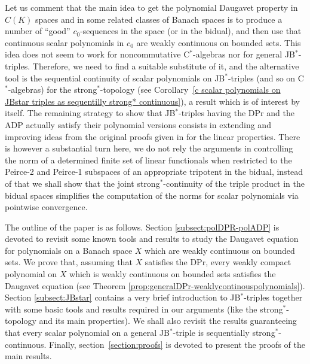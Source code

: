 \documentclass[10pt]{amsart}
\begin{document}
Let us comment that the main idea to get the polynomial Daugavet property in $C(K)$ spaces and in some related classes of Banach spaces is to produce a number of ``good'' $c_0$-sequences in the space (or in the bidual), and then use that continuous scalar polynomials in $c_0$ are weakly continuous on bounded sets. This idea does not seem to work for noncommutative C$^*$-algebras nor for general JB$^*$-triples. Therefore, we need to find a suitable substitute of it, and the alternative tool is the sequential continuity of scalar polynomials on JB$^*$-triples (and so on C$^*$-algebras) for the strong$^*$-topology (see Corollary~\ref{c scalar polynomials on JBstar triples as sequentilly strong* continuous}), a result which is of interest by itself. The remaining strategy to show that JB$^*$-triples having the DPr and the ADP actually satisfy their polynomial versions consists in extending and improving ideas from the original proofs given in \cite{MarOikh2004,Oik2002} for the linear properties. There is however a substantial turn here, we do not rely the arguments in controlling the norm of a determined finite set of linear functionals when restricted to the Peirce-2 and Peirce-1 subspaces of an appropriate tripotent in the bidual, instead of that we shall show that  the joint strong$^*$-continuity of the triple product in the bidual spaces simplifies the computation of the norms for scalar polynomials via pointwise convergence.
	
The outline of the paper is as follows. Section \ref{subsect:polDPR-polADP} is devoted to revisit some known tools and results to study the Daugavet equation for polynomials on a Banach space $X$ which are weakly continuous on bounded sets. We prove that, assuming that $X$ satisfies the DPr, every weakly compact polynomial on $X$ which is weakly continuous on bounded sets satisfies the Daugavet equation (see Theorem \ref{prop:generalDPr-weaklycontinouspolynomials}). Section \ref{subsect:JBstar} contains a very brief introduction to JB$^*$-triples together with some basic tools and results required in our arguments (like the strong$^*$-topology and its main properties). We shall also revisit the results guaranteeing that every scalar polynomial on a general JB$^*$-triple is sequentially strong$^*$-continuous. Finally, section~\ref{section:proofs} is devoted to present the proofs of the main results.
	
	
\end{document}
